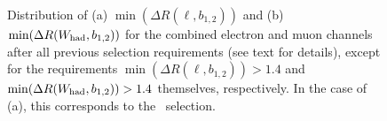 \begin{figure}[htb]\begin{center}
	\caption[bla]{Distribution of (a) $\min(\Delta R(\ell, b_{1,2}))$ 
        and (b) $\min(\Delta R(\whad, b_{1,2}))$
        for the combined electron and muon channels after all 
        previous selection requirements (see text for details), 
        except for the requirements $\min(\Delta R(\ell, b_{1,2}))>1.4$ and
        $\min(\Delta R(\whad, b_{1,2}))>1.4$ themselves, respectively.
        In the case of (a), this corresponds to the \loose\ selection.
        }
\end{center}\end{figure}


